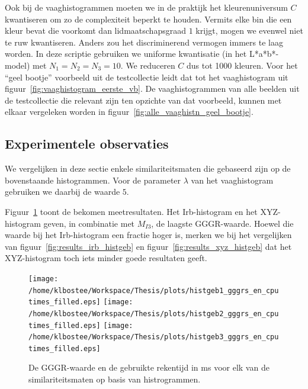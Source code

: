 Ook bij de vaaghistogrammen moeten we in de praktijk het kleurenuniversum $C$ 
kwantiseren om zo de complexiteit beperkt te houden. Vermits elke bin die een kleur
bevat die voorkomt dan lidmaatschapsgraad $1$ krijgt, mogen we evenwel niet te
ruw kwantiseren. Anders zou het discriminerend vermogen immers te laag worden. In deze
scriptie gebruiken we uniforme kwantisatie (in het L*a*b*-model) met $N_1=N_2=N_3=10$.
We reduceren $C$ dus tot 1000 kleuren. Voor het ``geel bootje'' voorbeeld uit de testcollectie
leidt dat tot het vaaghistogram uit figuur~\ref{fig:vaaghistogram_eerste_vb}. De vaaghistogrammen 
van alle beelden
uit de testcollectie die relevant zijn ten opzichte van dat voorbeeld, kunnen met
elkaar vergeleken worden in figuur~\ref{fig:alle_vaaghistn_geel_bootje}.

\subsection{Experimentele observaties}
\label{sectie:histogrammen_experimentele_observaties}

We vergelijken in deze sectie enkele similariteitsmaten die gebaseerd zijn op de bovenstaande
histogrammen. Voor de parameter $\lambda$ van het vaaghistogram gebruiken we daarbij
de waarde $5$.

Figuur~\ref{fig:histgeb_gggrs_en_cputimes} toont de bekomen meetresultaten. Het Irb-histogram
en het XYZ-histogram geven, in combinatie met $M_{I3}$, de laagste GGGR-waarde. Hoewel die
waarde bij het Irb-histogram een fractie hoger is, merken we bij het vergelijken van 
figuur~\ref{fig:results_irb_histgeb} en figuur~\ref{fig:results_xyz_histgeb} dat het 
XYZ-histogram toch iets minder goede resultaten geeft. 

\begin{figure}[bp]
\caption{\label{fig:histgeb_gggrs_en_cputimes}De GGGR-waarde en de gebruikte rekentijd in ms voor elk 
van de similariteitsmaten op basis van histrogrammen.}
\centering
\texttt{[image: /home/klbostee/Workspace/Thesis/plots/histgeb1\_gggrs\_en\_cputimes\_filled.eps]} 
\texttt{[image: /home/klbostee/Workspace/Thesis/plots/histgeb2\_gggrs\_en\_cputimes\_filled.eps]}
\texttt{[image: /home/klbostee/Workspace/Thesis/plots/histgeb3\_gggrs\_en\_cputimes\_filled.eps]}
\vspace{1pt}
\end{figure}

